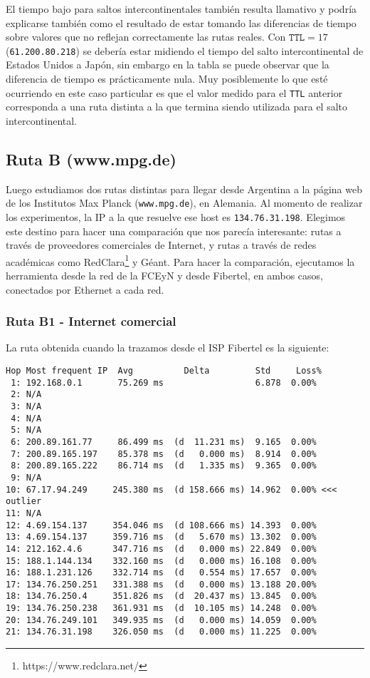 El tiempo bajo para saltos intercontinentales también resulta llamativo y podría
explicarse también como el resultado de estar tomando las diferencias de tiempo
sobre valores que no reflejan correctamente las rutas reales. Con $\texttt{TTL}
= 17$ (\texttt{61.200.80.218}) se debería estar midiendo el tiempo del salto
intercontinental de Estados Unidos a Japón, sin embargo en la tabla se puede
observar que la diferencia de tiempo es prácticamente nula. Muy posiblemente lo
que esté ocurriendo en este caso particular es que el valor medido para el
\texttt{TTL} anterior corresponda a una ruta distinta a la que termina siendo
utilizada para el salto intercontinental.


\subsection{Ruta B (www.mpg.de)}

Luego estudiamos dos rutas distintas para llegar desde Argentina a la página web de los Institutos Max Planck (\texttt{www.mpg.de}), en Alemania. Al momento de realizar los experimentos, la IP a la que resuelve ese host es \texttt{134.76.31.198}. Elegimos este destino para hacer una comparación que nos parecía interesante: rutas a través de proveedores comerciales de Internet, y rutas a través de redes académicas como RedClara\footnote{https://www.redclara.net/} y Géant. Para hacer la comparación, ejecutamos la herramienta desde la red de la FCEyN y desde Fibertel, en ambos casos, conectados por Ethernet a cada red.

\subsubsection{Ruta B1 - Internet comercial}


La ruta obtenida cuando la trazamos desde el ISP Fibertel es la siguiente:

\begin{Verbatim}[fontsize=\scriptsize]
Hop Most frequent IP  Avg          Delta         Std     Loss%
 1: 192.168.0.1       75.269 ms                  6.878  0.00% 
 2: N/A            
 3: N/A            
 4: N/A            
 5: N/A            
 6: 200.89.161.77     86.499 ms  (d  11.231 ms)  9.165  0.00% 
 7: 200.89.165.197    85.378 ms  (d   0.000 ms)  8.914  0.00% 
 8: 200.89.165.222    86.714 ms  (d   1.335 ms)  9.365  0.00% 
 9: N/A            
10: 67.17.94.249     245.380 ms  (d 158.666 ms) 14.962  0.00% <<< outlier
11: N/A            
12: 4.69.154.137     354.046 ms  (d 108.666 ms) 14.393  0.00% 
13: 4.69.154.137     359.716 ms  (d   5.670 ms) 13.302  0.00% 
14: 212.162.4.6      347.716 ms  (d   0.000 ms) 22.849  0.00% 
15: 188.1.144.134    332.160 ms  (d   0.000 ms) 16.108  0.00% 
16: 188.1.231.126    332.714 ms  (d   0.554 ms) 17.657  0.00% 
17: 134.76.250.251   331.388 ms  (d   0.000 ms) 13.188 20.00% 
18: 134.76.250.4     351.826 ms  (d  20.437 ms) 13.845  0.00% 
19: 134.76.250.238   361.931 ms  (d  10.105 ms) 14.248  0.00% 
20: 134.76.249.101   349.935 ms  (d   0.000 ms) 14.059  0.00% 
21: 134.76.31.198    326.050 ms  (d   0.000 ms) 11.225  0.00%
\end{Verbatim}

